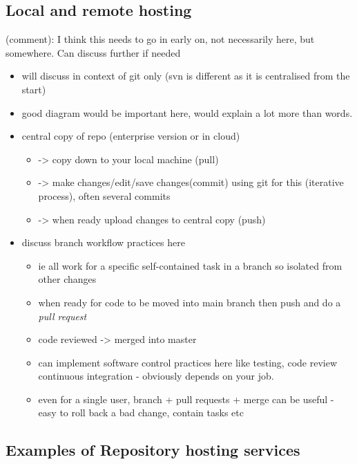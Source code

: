 \documentclass[
]{article}
\providecommand{\tightlist}{%
  \setlength{\itemsep}{0pt}\setlength{\parskip}{0pt}}
\begin{document}
\hypertarget{local-and-remote-hosting}{%
\subsection{Local and remote hosting}\label{local-and-remote-hosting}}

(comment): I think this needs to go in early on, not necessarily here,
but somewhere. Can discuss further if needed

\begin{itemize}
\tightlist
\item
  will discuss in context of git only (svn is different as it is
  centralised from the start)
\item
  good diagram would be important here, would explain a lot more than
  words.
\item
  central copy of repo (enterprise version or in cloud)

  \begin{itemize}
  \tightlist
  \item
    -\textgreater{} copy down to your local machine (pull)
  \item
    -\textgreater{} make changes/edit/save changes(commit) using git for
    this (iterative process), often several commits
  \item
    -\textgreater{} when ready upload changes to central copy (push)
  \end{itemize}
\item
  discuss branch workflow practices here

  \begin{itemize}
  \tightlist
  \item
    ie all work for a specific self-contained task in a branch so
    isolated from other changes
  \item
    when ready for code to be moved into main branch then push and do a
    \emph{pull request}
  \item
    code reviewed -\textgreater{} merged into master
  \item
    can implement software control practices here like testing, code
    review continuous integration - obviously depends on your job.
  \item
    even for a single user, branch + pull requests + merge can be useful
    - easy to roll back a bad change, contain tasks etc
  \end{itemize}
\end{itemize}

\hypertarget{examples-of-repository-hosting-services}{%
\subsection{Examples of Repository hosting
services}\label{examples-of-repository-hosting-services}}
\end{document}

